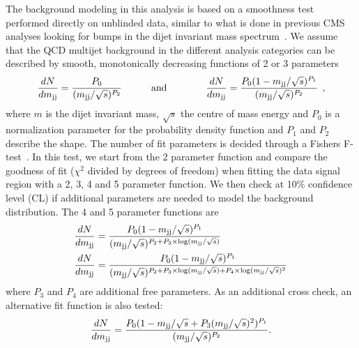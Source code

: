 The background modeling in this analysis is based on a smoothness test performed directly on unblinded data, similar to what is done in previous CMS analyses looking for bumps in the dijet invariant mass spectrum~\cite{Chatrchyan:2012ypy,CMS-PAS-EXO-12-059}. We assume that the QCD multijet background in the different analysis categories can be described by smooth, monotonically decreasing functions of 2 or 3 parameters
\begin{equation}
\label{eq:dijet1}
\frac{dN}{dm_\mathrm{jj}}= \frac{ P_0 } { (m_\mathrm{jj}/\sqrt{s})^{P_2} }\quad\quad\quad{\rm and}
\quad\quad\quad\quad
\frac{dN}{dm_\mathrm{jj}}= \frac{ P_0(1-m_\mathrm{jj}/\sqrt{s})^{P_1} } { (m_\mathrm{jj}/\sqrt{s})^{P_2} }\:\:,
\end{equation}
where $m$ is the dijet invariant mass, $\sqrt{s}$ the centre of mass energy and $P_0$ is a normalization parameter for the probability density function and $P_1$ and $ P_2$ describe the shape. The number of fit parameters is decided through a Fishers F-test~\cite{RePEc:bla:istatr:v:80:y:2012:i:3:p:491-491}. In this test, we start from the 2 parameter function and compare the goodness of fit ($\chi^2$ divided by degrees of freedom) when fitting the data signal region with a 2, 3, 4 and 5 parameter function. We then check at 10\% confidence level (CL) if additional parameters are needed to model the background distribution. The 4 and 5 parameter functions are
\begin{align}
\label{eq:dijet2}
\frac{dN}{d m_\mathrm{jj}} &= \frac{ P_0(1-m_\mathrm{jj}/\sqrt{s})^{P_1} } {(m_\mathrm{jj}/\sqrt{s})^{P_2+P_3\times\log(m_\mathrm{jj}/\sqrt{s})} }\\
\frac{dN}{d m_\mathrm{jj}} &= \frac{ P_0(1-m_\mathrm{jj}/\sqrt{s})^{P_1} } {(m_\mathrm{jj}/\sqrt{s})^{P_2+P_3\times\log(m_\mathrm{jj}/\sqrt{s})+P_4\times\log(m_\mathrm{jj}/\sqrt{s})^2} }
\end{align}
where $P_3$ and $P_4$ are additional free parameters. As an additional cross check, an alternative fit function is also tested:
\begin{equation}
\label{eq:dijet4}
\frac{dN}{dm_\mathrm{jj}} = \frac{ P_0(1-m_\mathrm{jj} / \sqrt{s}+P_3(m_\mathrm{jj} / \sqrt{s})^2)^{P_1} } { (m_\mathrm{jj}/\sqrt{s})^{P_2} }.
\end{equation}

